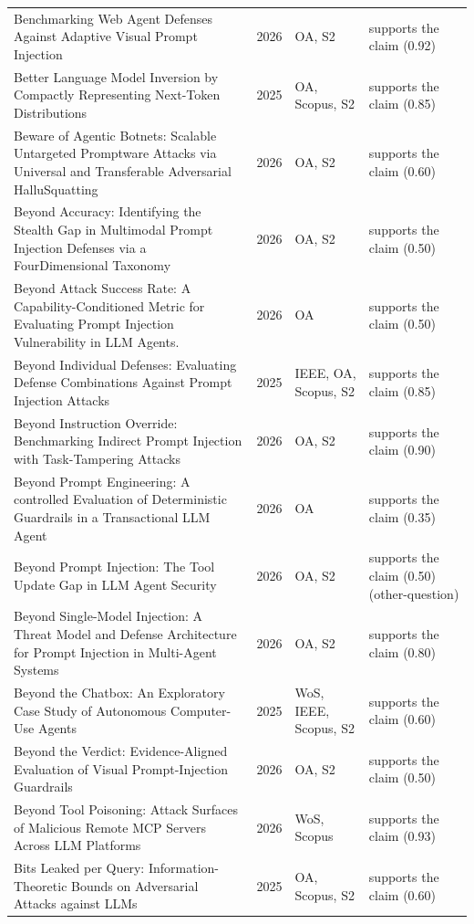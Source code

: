 \begin{longtable}{@{}%
  >{\raggedright\arraybackslash}p{}c%
  >{\raggedright\arraybackslash}p{}%
  >{\raggedright\arraybackslash}p{}@{}}
Benchmarking Web Agent Defenses Against Adaptive Visual Prompt Injection & 2026 & OA, S2 & supports the claim (0.92) \\
Better Language Model Inversion by Compactly Representing Next-Token Distributions & 2025 & OA, Scopus, S2 & supports the claim (0.85) \\
Beware of Agentic Botnets: Scalable Untargeted Promptware Attacks via Universal and Transferable Adversarial HalluSquatting & 2026 & OA, S2 & supports the claim (0.60) \\
Beyond Accuracy: Identifying the Stealth Gap in Multimodal Prompt Injection Defenses via a FourDimensional Taxonomy & 2026 & OA, S2 & supports the claim (0.50) \\
Beyond Attack Success Rate: A Capability-Conditioned Metric for Evaluating Prompt Injection Vulnerability in LLM Agents. & 2026 & OA & supports the claim (0.50) \\
Beyond Individual Defenses: Evaluating Defense Combinations Against Prompt Injection Attacks & 2025 & IEEE, OA, Scopus, S2 & supports the claim (0.85) \\
Beyond Instruction Override: Benchmarking Indirect Prompt Injection with Task-Tampering Attacks & 2026 & OA, S2 & supports the claim (0.90) \\
Beyond Prompt Engineering: A controlled Evaluation of Deterministic Guardrails in a Transactional LLM Agent & 2026 & OA & supports the claim (0.35) \\
Beyond Prompt Injection: The Tool Update Gap in LLM Agent Security & 2026 & OA, S2 & supports the claim (0.50) (other-question) \\
Beyond Single-Model Injection: A Threat Model and Defense Architecture for Prompt Injection in Multi-Agent Systems & 2026 & OA, S2 & supports the claim (0.80) \\
Beyond the Chatbox: An Exploratory Case Study of Autonomous Computer-Use Agents & 2025 & WoS, IEEE, Scopus, S2 & supports the claim (0.60) \\
Beyond the Verdict: Evidence-Aligned Evaluation of Visual Prompt-Injection Guardrails & 2026 & OA, S2 & supports the claim (0.50) \\
Beyond Tool Poisoning: Attack Surfaces of Malicious Remote MCP Servers Across LLM Platforms & 2026 & WoS, Scopus & supports the claim (0.93) \\
Bits Leaked per Query: Information-Theoretic Bounds on Adversarial Attacks against LLMs & 2025 & OA, Scopus, S2 & supports the claim (0.60) \\

\end{longtable}
